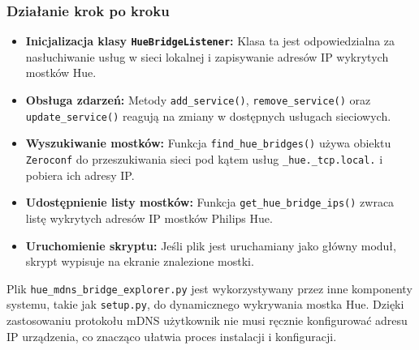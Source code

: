 \documentclass[12pt]{article}
\begin{document}
\subsubsection*{Działanie krok po kroku}
\begin{itemize}
    \item \textbf{Inicjalizacja klasy \texttt{HueBridgeListener}:} Klasa ta jest odpowiedzialna za nasłuchiwanie usług w sieci lokalnej i zapisywanie adresów IP wykrytych mostków Hue.
    \item \textbf{Obsługa zdarzeń:} Metody \texttt{add\_service()}, \texttt{remove\_service()} oraz \texttt{update\_service()} reagują na zmiany w dostępnych usługach sieciowych.
    \item \textbf{Wyszukiwanie mostków:} Funkcja \texttt{find\_hue\_bridges()} używa obiektu \texttt{Zeroconf} do przeszukiwania sieci pod kątem usług \texttt{\_hue.\_tcp.local.} i pobiera ich adresy IP.
    \item \textbf{Udostępnienie listy mostków:} Funkcja \texttt{get\_hue\_bridge\_ips()} zwraca listę wykrytych adresów IP mostków Philips Hue.
    \item \textbf{Uruchomienie skryptu:} Jeśli plik jest uruchamiany jako główny moduł, skrypt wypisuje na ekranie znalezione mostki.
\end{itemize}
Plik \texttt{hue\_mdns\_bridge\_explorer.py} jest wykorzystywany przez inne komponenty systemu, takie jak \texttt{setup.py}, do dynamicznego wykrywania mostka Hue.
Dzięki zastosowaniu protokołu mDNS użytkownik nie musi ręcznie konfigurować adresu IP urządzenia, co znacząco ułatwia proces instalacji i konfiguracji.
\end{document}
